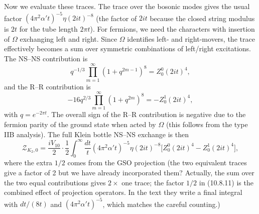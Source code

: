 \documentclass[11pt,a4paper]{article}
\begin{document}
Now we evaluate these traces. The trace over the bosonic modes gives the usual factor $(4\pi^2\alpha' t)^{-5} \eta(2it)^{-8}$ (the factor of $2it$ because the closed string modulus is $2t$ for the tube length $2\pi t$). For fermions, we need the characters with insertion of $\Omega$ exchanging left and right. Since $\Omega$ identifies left- and right-movers, the trace effectively becomes a sum over symmetric combinations of left/right excitations. The NS–NS contribution is
\begin{equation}
q^{-1/3} \prod_{m=1}^\infty (1 + q^{2m-1})^8 = Z^0_0(2it)^4,
\end{equation}
and the R–R contribution is
\begin{equation}
-16 q^{2/3} \prod_{m=1}^\infty (1 + q^{2m})^8 = - Z^1_0(2it)^4,
\end{equation}
with $q = e^{-2\pi t}$. The overall sign of the R–R contribution is negative due to the fermion parity of the ground state when acted by $\Omega$ (this follows from the type IIB analysis). The full Klein bottle NS–NS exchange is then
\begin{equation}
\mathcal{Z}_{K_2,0} = \frac{i V_{10}}{2} \cdot \frac{1}{2} \int_0^\infty \frac{dt}{t} (4\pi^2\alpha' t)^{-5} \eta(2it)^{-8} \big[ Z^0_0(2it)^4 - Z^1_0(2it)^4 \big],
\label{eq:ZK20before}
\end{equation}
where the extra $1/2$ comes from the GSO projection (the two equivalent traces give a factor of 2 but we have already incorporated them? Actually, the sum over the two equal contributions gives $2 \times$ one trace; the factor $1/2$ in (10.8.11) is the combined effect of projection operators. In the text they write a final integral with $dt/(8t)$ and $(4\pi^2\alpha' t)^{-5}$, which matches the careful counting.)
\end{document}
